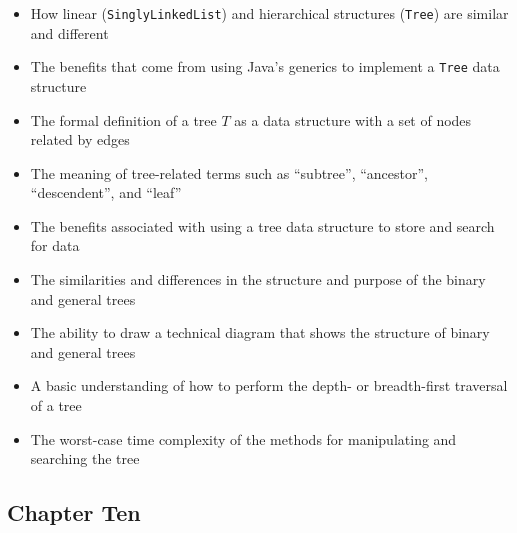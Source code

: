 \documentclass[11pt]{article}
\newcommand{\program}[1]{\lstinline{#1}}
\begin{document}
\begin{itemize}

  \item How linear (\program{SinglyLinkedList}) and hierarchical
    structures (\program{Tree}) are similar and different

  \item The benefits that come from using Java's generics to implement
    a \program{Tree} data structure

  \item The formal definition of a tree $T$ as a data structure with a set of
    nodes related by edges

  \item The meaning of tree-related terms such as ``subtree'', ``ancestor'',
    ``descendent'', and ``leaf''

  \item The benefits associated with using a tree data structure to store and
    search for data

  \item The similarities and differences in the structure and purpose of the
    binary and general trees

  \item The ability to draw a technical diagram that shows the structure of
    binary and general trees

  \item A basic understanding of how to perform the depth- or breadth-first
    traversal of a tree

  \item The worst-case time complexity of the methods for manipulating and
    searching the tree

\end{itemize}

\subsection*{Chapter Ten}
\end{document}
